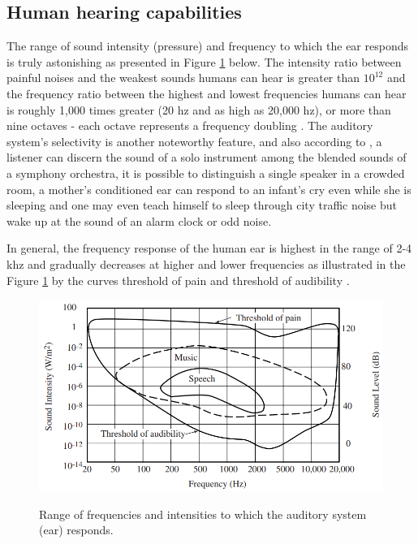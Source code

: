 \subsection{Human hearing capabilities}
\label{subsec:microphones_Human_hearing_capabilities}

The range of sound intensity (pressure) and frequency to which the ear responds is truly astonishing as presented in Figure \ref{fig:frmwk_microphone_human_hearing} below. The intensity ratio between painful noises and the weakest sounds humans can hear is greater than $10^{12}$ and the frequency ratio between the highest and lowest frequencies humans can hear is roughly 1,000 times greater (20 \gls{hz} and as high as 20,000 \gls{hz}), or more than nine octaves - each octave represents a frequency doubling \cite{Rossing2013}. The auditory system's selectivity is another noteworthy feature, and also according to \textcite{Rossing2013}, a listener can discern the sound of a solo instrument among the blended sounds of a symphony orchestra, it is possible to distinguish a single speaker in a crowded room, a mother's conditioned ear can respond to an infant's cry even while she is sleeping and one may even teach himself to sleep through city traffic noise but wake up at the sound of an alarm clock or odd noise.

In general, the frequency response of the human ear is highest in the range of 2-4 \gls{k}\gls{hz} and gradually decreases at higher and lower frequencies as illustrated in the Figure \ref{fig:frmwk_microphone_human_hearing} by the curves threshold of pain and threshold of audibility \cite{Moore2013}.

\begin{figure}[htbp]
    \raggedright
        \caption{Range of frequencies and intensities to which the auditory system (ear) responds.}
        \includegraphics[width=1\textwidth]{resources/images/030-theoretical_framework/Framework_microphone_human_hearing.png}
        \label{fig:frmwk_microphone_human_hearing}
\end{figure}



